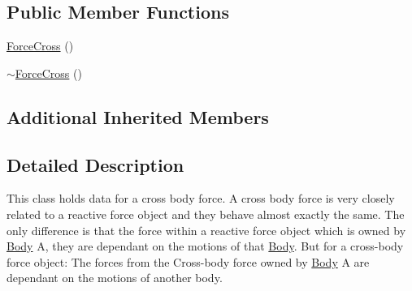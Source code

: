 \subsection*{Public Member Functions}
\begin{DoxyCompactItemize}
\item 
\hyperlink{classosea_1_1ofreq_1_1_force_cross_a0dd29488051709ddbb950ee75565c53a}{Force\-Cross} ()
\item 
\hyperlink{classosea_1_1ofreq_1_1_force_cross_ad5fc44b9a9d71823f80467f560cfdecc}{$\sim$\-Force\-Cross} ()
\end{DoxyCompactItemize}
\subsection*{Additional Inherited Members}


\subsection{Detailed Description}
This class holds data for a cross body force. A cross body force is very closely related to a reactive force object and they behave almost exactly the same. The only difference is that the force within a reactive force object which is owned by \hyperlink{classosea_1_1ofreq_1_1_body}{Body} A, they are dependant on the motions of that \hyperlink{classosea_1_1ofreq_1_1_body}{Body}. But for a cross-\/body force object\-: The forces from the Cross-\/body force owned by \hyperlink{classosea_1_1ofreq_1_1_body}{Body} A are dependant on the motions of another body. 

